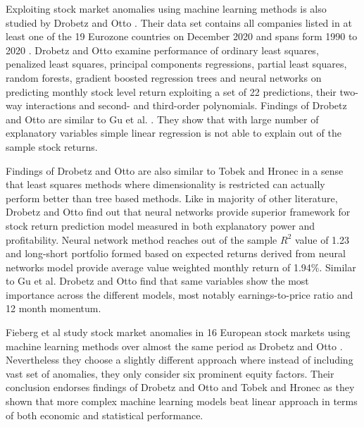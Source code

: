 \documentclass{article}
\begin{document}

Exploiting stock market anomalies using machine learning methods is also studied by Drobetz and Otto \citeyear{Drobetz}. Their data set contains all companies listed in at least one of the 19 Eurozone countries on December 2020 and spans form 1990 to 2020 \footnotemark. Drobetz and Otto examine performance of ordinary least squares, penalized least squares, principal components regressions, partial least squares, random forests, gradient boosted regression trees and neural networks on predicting monthly stock level return exploiting a set of 22 predictions, their two-way interactions and second- and third-order polynomials. Findings of Drobetz and Otto are similar to Gu et al. \citeyear{guetal}. They show that with large number of explanatory variables simple linear regression is not able to explain out of the sample stock returns. 


Findings of Drobetz and Otto \citeyear{Drobetz} are also similar to Tobek and Hronec \citeyear{TOBEK2021100588} in a sense that least squares methods where dimensionality is restricted can actually perform better than tree based methods. Like in majority of other literature, Drobetz and Otto find out that neural networks provide superior framework for stock return prediction model measured in both explanatory power and profitability. Neural network method reaches out of the sample $R^{2}$ value of 1.23 and long-short portfolio formed based on expected returns derived from neural networks model provide average value weighted monthly return of 1.94\%. Similar to Gu et al. \citeyear{guetal} Drobetz and Otto find that same variables show the most importance across the different models, most notably earnings-to-price ratio and 12 month momentum.

Fieberg et al \citeyear{Fieberg} study stock market anomalies in 16 European stock markets using machine learning methods over almost the same period as Drobetz and Otto \citeyear{Drobetz} \footnotemark. Nevertheless they choose a slightly different approach where instead of including vast set of anomalies, they only consider six prominent equity factors. Their conclusion endorses findings of Drobetz and Otto \citeyear{Drobetz} and Tobek and Hronec \citeyear{TOBEK2021100588} as they shown that more complex machine learning models beat linear approach in terms of both economic and statistical performance.
\end{document}
